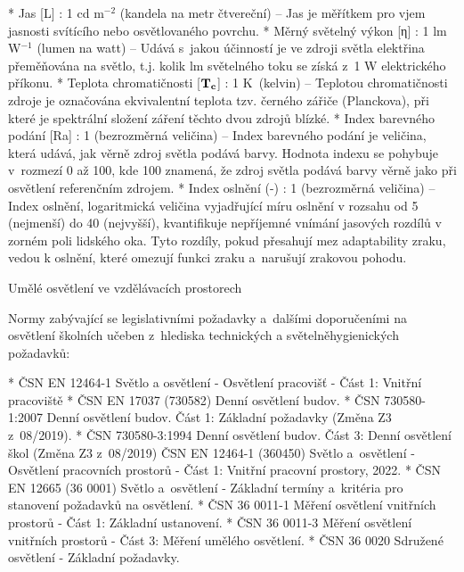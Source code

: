 \begitems
* {\sbf Jas [L]} : 1 cd m$^{-2}$ (kandela na metr čtvereční)
    -- Jas je měřítkem pro vjem jasnosti svítícího nebo osvětlovaného povrchu.
* {\sbf Měrný světelný výkon [η]} : 1 lm W$^{-1}$ (lumen na watt) --
    Udává s~jakou účinností je ve zdroji světla elektřina přeměňována na světlo, t.j. kolik
    lm světelného toku se získá z~1 W elektrického příkonu.
* {\sbf Teplota chromatičnosti [$\bf{T_c}$]} : 1 K~(kelvin) -- Teplotou chromatičnosti zdroje je označována ekvivalentní
    teplota tzv. černého zářiče (Planckova), při které je spektrální složení záření těchto dvou zdrojů blízké.
* {\sbf Index barevného podání [Ra]} : 1 (bezrozměrná veličina) --
    Index barevného podání je veličina, která udává, jak věrně zdroj světla podává barvy.
    Hodnota indexu se pohybuje v~rozmezí 0 až 100, kde 100 znamená, že zdroj světla podává barvy věrně
    jako při osvětlení referenčním zdrojem.
* {\sbf Index oslnění  (-)} : 1 (bezrozměrná veličina) --
    Index oslnění, logaritmická veličina vyjadřující míru oslnění v rozsahu
    od 5 (nejmenší) do 40 (nejvyšší), kvantifikuje nepříjemné vnímání jasových
    rozdílů v zorném poli lidského oka. Tyto rozdíly, pokud přesahují mez
    adaptability zraku, vedou k oslnění, které omezují funkci zraku a~narušují zrakovou pohodu.

\enditems

\sec Umělé osvětlení ve vzdělávacích prostorech

Normy zabývající se legislativními požadavky a~dalšími doporučeními na osvětlení školních učeben
z~hlediska technických a světelně​ hygienických požadavků:


\begitems
* ČSN EN 12464-1 Světlo a osvětlení - Osvětlení pracovišť - Část 1: Vnitřní pracoviště
* ČSN EN 17037 (730582) Denní osvětlení budov.
* ČSN 730580-1:2007 Denní osvětlení budov. Část 1: Základní požadavky (Změna Z3 z~08/2019).
* ČSN 730580-3:1994 Denní osvětlení budov. Část 3: Denní osvětlení škol (Změna Z3 z~08/2019)
ČSN EN 12464-1 (360450) Světlo a~osvětlení - Osvětlení pracovních prostorů - Část 1: Vnitřní pracovní prostory, 2022.
* ČSN EN 12665 (36 0001) Světlo a~osvětlení - Základní termíny a~kritéria pro stanovení požadavků na osvětlení.
* ČSN 36 0011-1 Měření osvětlení vnitřních prostorů - Část 1: Základní ustanovení.
* ČSN 36 0011-3 Měření osvětlení vnitřních prostorů - Část 3: Měření umělého osvětlení.
* ČSN 36 0020 Sdružené osvětlení - Základní požadavky.
\enditems

